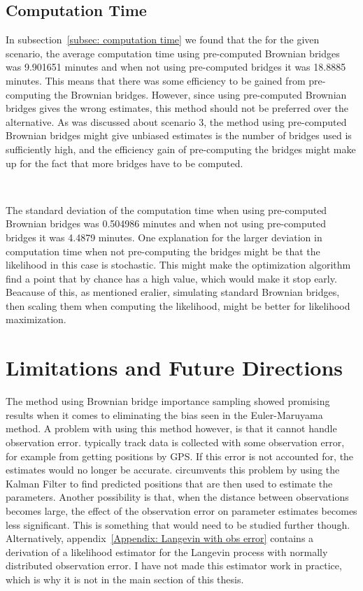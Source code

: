 \subsection{Computation Time}

In subsection~\ref{subsec: computation time} we found that the for the given scenario, the average computation time using pre-computed Brownian bridges was 9.901651 minutes and when not using pre-computed bridges it was 18.8885 minutes. This means that there was some efficiency to be gained from pre-computing the Brownian bridges. However, since using pre-computed Brownian bridges gives the wrong estimates, this method should not be preferred over the alternative. As was discussed about scenario 3, the method using pre-computed Brownian bridges might give unbiased estimates is the number of bridges used is sufficiently high, and the efficiency gain of pre-computing the bridges might make up for the fact that more bridges have to be computed.

\

The standard deviation of the computation time when using pre-computed Brownian bridges was 0.504986 minutes and when not using pre-computed bridges it was  4.4879 minutes. One explanation for the larger deviation in computation time when not pre-computing the bridges might be that the likelihood in this case is stochastic. This might make the optimization algorithm find a point that by chance has a high value, which would make it stop early. Beacause of this, as mentioned eralier, simulating standard Brownian bridges, then scaling them when computing the likelihood, might be better for likelihood maximization.





\section{Limitations and Future Directions}
The method using Brownian bridge importance sampling showed promising results when it comes to eliminating the bias seen in the Euler-Maruyama method. A problem with using this method however, is that it cannot handle observation error. typically track data is collected with some observation error, for example from getting positions by GPS. If this error is not accounted for, the estimates would no longer be accurate. \parencite{michelot_langevin_2019} circumvents this problem by using the Kalman Filter to find predicted positions that are then used to estimate the parameters. Another possibility is that, when the distance between observations becomes large, the effect of the observation error on parameter estimates becomes less significant. This is something that would need to be studied further though. Alternatively, appendix~\ref{Appendix: Langevin with obs error} contains a derivation of a likelihood estimator for the Langevin process with normally distributed observation error. I have not made this estimator work in practice, which is why it is not in the main section of this thesis.

